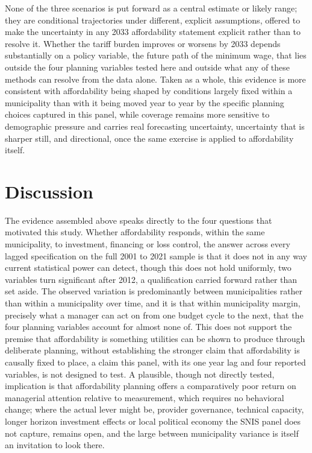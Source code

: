 \documentclass[preprint,12pt]{elsarticle}
\begin{document}
None of the three scenarios is put forward as a central estimate or likely range; they are conditional trajectories under different, explicit assumptions, offered to make the uncertainty in any 2033 affordability statement explicit rather than to resolve it. Whether the tariff burden improves or worsens by 2033 depends substantially on a policy variable, the future path of the minimum wage, that lies outside the four planning variables tested here and outside what any of these methods can resolve from the data alone. Taken as a whole, this evidence is more consistent with affordability being shaped by conditions largely fixed within a municipality than with it being moved year to year by the specific planning choices captured in this panel, while coverage remains more sensitive to demographic pressure and carries real forecasting uncertainty, uncertainty that is sharper still, and directional, once the same exercise is applied to affordability itself.

\section{Discussion}\label{sec12}

The evidence assembled above speaks directly to the four questions that motivated this study. Whether affordability responds, within the same municipality, to investment, financing or loss control, the answer across every lagged specification on the full 2001 to 2021 sample is that it does not in any way current statistical power can detect, though this does not hold uniformly, two variables turn significant after 2012, a qualification carried forward rather than set aside. The observed variation is predominantly between municipalities rather than within a municipality over time, and it is that within municipality margin, precisely what a manager can act on from one budget cycle to the next, that the four planning variables account for almost none of. This does not support the premise that affordability is something utilities can be shown to produce through deliberate planning, without establishing the stronger claim that affordability is causally fixed to place, a claim this panel, with its one year lag and four reported variables, is not designed to test. A plausible, though not directly tested, implication is that affordability planning offers a comparatively poor return on managerial attention relative to measurement, which requires no behavioral change; where the actual lever might be, provider governance, technical capacity, longer horizon investment effects or local political economy the SNIS panel does not capture, remains open, and the large between municipality variance is itself an invitation to look there.
\end{document}
